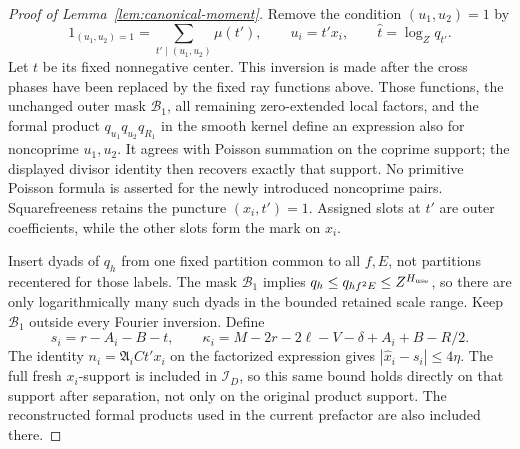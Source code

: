 \documentclass[12pt]{article}
\begin{document}
\begin{proof}[Proof of Lemma~\ref{lem:canonical-moment}]
Remove the condition \((u_1,u_2)=1\) by
\[
 1_{(u_1,u_2)=1}=\sum_{t'\mid(u_1,u_2)}\mu(t'),\qquad u_i=t'x_i,
 \qquad \widehat t=\log_Zq_{t'}.
\]
Let \(t\) be its fixed nonnegative center.
This inversion is made after the cross phases have been replaced by
the fixed ray functions above.  Those functions, the unchanged outer
mask \(\mathcal B_1\), all remaining
zero-extended local factors, and the formal product
\(q_{u_1}q_{u_2}q_{R_1}\) in the smooth kernel define an expression
also for noncoprime \(u_1,u_2\).  It agrees with Poisson summation on
the coprime support; the displayed divisor identity then recovers
exactly that support.  No primitive Poisson formula is asserted for
the newly introduced noncoprime pairs.  Squarefreeness retains the
puncture \((x_i,t')=1\).  Assigned slots at \(t'\) are outer
coefficients, while the other slots form the mark on \(x_i\).

Insert dyads of \(q_h\) from one fixed partition common to all \(f,E\),
not partitions recentered for those labels.  The mask \(\mathcal B_1\)
implies \(q_h\le q_{hf^2E}\le Z^{H_{\rm use}}\), so there are only
logarithmically many such dyads in the bounded retained scale range.
Keep \(\mathcal B_1\) outside every Fourier inversion.  Define
\[
 s_i=r-A_i-B-t,\qquad
 \kappa_i=M-2r-2\ell-V-\delta+A_i+B-R/2.
\]
The identity \(n_i=\mathfrak A_iCt'x_i\) on the factorized expression
gives \(|\widehat x_i-s_i|\le4\eta\).  The full fresh \(x_i\)-support
is included in \(\mathcal I_D\), so this same bound holds directly on
that support after separation, not only on the original product support.
The reconstructed formal products used in the current prefactor are also
included there.


\end{proof}
\end{document}
